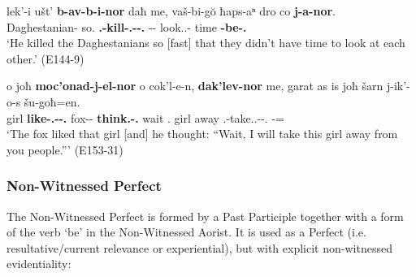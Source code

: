 \begin{exe}
	\ex\label{verbflex-ex24}
	\begin{xlist}
		
		
			\ex\label{verbflex-ex24a}
			\gll lek'-i ušt' \textbf{b-av-b-i-nor} daħ me, vaš-bi-g\u{o} ħaps-aⁿ dro co \textbf{j-a-nor}. \\
			Daghestanian-{\Pl} so.{\Dist} \textbf{{\M}.{\Pl}-kill-{\M}.{\Pl}-{\Tr}-{\Nw}.{\Rem}} {\Pv} {\Subord} {\Recp}-{\Pl}-{\All} look.{\Pfv}.{\Pl}-{\Inf} time {\Neg} \textbf{{\J}-be-{\Nw}.{\Rem}} \\
			\trans `He killed the Daghestanians so [fast] that they didn't have time to look at each other.'
			\hfill (E144-9)
		
		
		
			\ex\label{verbflex-ex24b}
			\gll o joħ \textbf{moc'onad-j-el-nor} o cok'l-e-n, \textbf{dak'lev-nor} me, garat as is joħ šarn j-ik'-o-s šu-goħ=en. \\
			{\Dist} girl \textbf{like-{\F}.{\Sg}-{\Intr}-{\Nw}.{\Rem}} {\Dist} fox-{\Obl}-{\Dat} \textbf{think.{\Pfv}-{\Nw}.{\Rem}} {\Subord} wait {\Fsg}.{\Erg} {\Med} girl away {\F}.{\Sg}-take.{\Anim}.{\Pfv}-{\Npst}-{\Fsg}.{\Erg} {\Spl}-{\Adess}={\Quot} \\
			\trans `The fox liked that girl [and] he thought: ``Wait, I will take this girl away from you people.{''}'
			\hfill (E153-31)
		
		
	\end{xlist}
\end{exe}

\subsubsection{Non-Witnessed Perfect}

The Non-Witnessed Perfect is formed by a Past Participle together with a form of the verb `be' in the Non-Witnessed Aorist. It is used as a Perfect (i.e. resultative/current relevance or experiential), but with explicit non-witnessed evidentiality:

